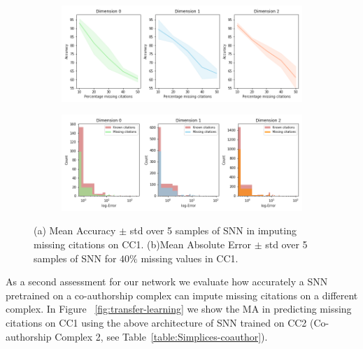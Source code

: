 \begin{figure}[tb]
\centering
 \begin{subfigure}[t]{-0.8\textwidth}
 \vspace{-4cm}
  \end{subfigure}
\begin{subfigure}[t]{0.8\textwidth}
\centering
   \includegraphics[scale=0.35]{./figures/accuracy_network1.png}
\end{subfigure}
 \begin{subfigure}[t]{0.8\textwidth}
  \end{subfigure}
\begin{subfigure}[t]{0.8\textwidth}
\centering
\vspace{-0.5cm}
   \includegraphics[scale=0.36]{./figures/Error_dist_start150250_seed6666_notsee40.png}
\end{subfigure}
\caption{(a) Mean Accuracy $\pm$ std over 5 samples of SNN in imputing missing citations on CC1. (b)Mean Absolute Error $\pm$ std over 5 samples of SNN for $40\%$ missing values in CC1. }
\label{fig:accuracy-error}
\end{figure}
As a second assessment for our network we evaluate how accurately a SNN pretrained on a co-authorship complex can impute missing citations on a different complex. In Figure ~\ref{fig:transfer-learning} we show the MA in predicting missing citations on CC1 using the above architecture of SNN trained on CC2 (Co-authorship Complex 2, see Table~\ref{table:Simplices-coauthor}).
